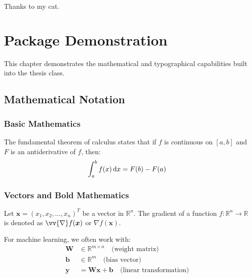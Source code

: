 \documentclass[english]{thesis-uoc}
\begin{document}
\maketitle

\acknowledgments
Thanks to my cat.

\dedication{To my dog.}


\abstractsection
\lipsum[1]

\chapter{Package Demonstration}
\label{chap:demo}

This chapter demonstrates the mathematical and typographical capabilities built into 
the thesis class.

\section{Mathematical Notation}

\subsection{Basic Mathematics}

The fundamental theorem of calculus states that if $f$ is continuous on $[a,b]$ and $F$ 
is an antiderivative of $f$, then:
%
\begin{equation}
\label{eq:ftc}
\int_a^b f(x) \dif x = F(b) - F(a)
\end{equation}
%

\subsection{Vectors and Bold Mathematics}

Let $\bm{x} = (x_1, x_2, \ldots, x_n)^T$ be a vector in $\mathbb{R}^n$. 
The gradient of a function 
$f: \mathbb{R}^n \to \mathbb{R}$ is denoted as $\vv{\nabla} f(\bm{x})$ or 
$\nabla f(\bm{x})$.

For machine learning, we often work with:
%
\begin{align}
\bm{W} &\in \mathbb{R}^{m \times n} \quad \text{(weight matrix)}\\
\bm{b} &\in \mathbb{R}^m \quad \text{(bias vector)}\\
\bm{y} &= \bm{W}\bm{x} + \bm{b} \quad \text{(linear transformation)}
\end{align}
\end{document}

